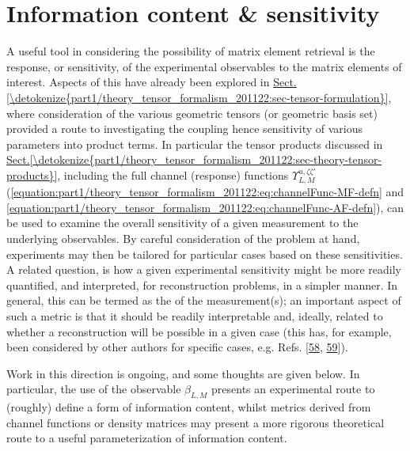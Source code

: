 \documentclass[letterpaper,table,10pt,english]{jupyterBook}
\begin{document}
\section{Information content \& sensitivity}
\label{\detokenize{part1/theory_info_content_221122:information-content-sensitivity}}\label{\detokenize{part1/theory_info_content_221122:sec-info-content}}\label{\detokenize{part1/theory_info_content_221122::doc}}
\sphinxAtStartPar
A useful tool in considering the possibility of matrix element retrieval is the response, or sensitivity, of the experimental observables to the matrix elements of interest. Aspects of this have already been explored in \hyperref[\detokenize{part1/theory_tensor_formalism_201122:sec-tensor-formulation}]{Sect.\@ \ref{\detokenize{part1/theory_tensor_formalism_201122:sec-tensor-formulation}}}, where consideration of the various geometric tensors (or geometric basis set) provided a route to investigating the coupling \sphinxhyphen{} hence sensitivity \sphinxhyphen{} of various parameters into product terms. In particular the tensor products discussed in \hyperref[\detokenize{part1/theory_tensor_formalism_201122:sec-theory-tensor-products}]{Sect.\@ \ref{\detokenize{part1/theory_tensor_formalism_201122:sec-theory-tensor-products}}}, including the full channel (response) functions \(\varUpsilon_{L,M}^{u,\zeta\zeta'}\) (\eqref{equation:part1/theory_tensor_formalism_201122:eq:channelFunc-MF-defn} and \eqref{equation:part1/theory_tensor_formalism_201122:eq:channelFunc-AF-defn}), can be used to examine the overall sensitivity of a given measurement to the underlying observables. By careful consideration of the problem at hand, experiments may then be tailored for particular cases based on these sensitivities. A related question, is how a given experimental sensitivity might be more readily quantified, and interpreted, for reconstruction problems, in a simpler manner. In general, this can be termed as the  of the measurement(s); an important aspect of such a metric is that it should be readily interpretable and, ideally, related to whether a reconstruction will be possible in a given case (this has, for example, been considered by other authors for specific cases, e.g. Refs. {[}\hyperlink{cite.backmatter/bibliography:id726}{58}, \hyperlink{cite.backmatter/bibliography:id692}{59}{]}).

\sphinxAtStartPar
Work in this direction is ongoing, and some thoughts are given below. In particular, the use of the observable \(\beta_{L,M}\) presents an experimental route to (roughly) define a form of information content, whilst metrics derived from channel functions or density matrices may present a more rigorous theoretical route to a useful parameterization of information content.
\end{document}
